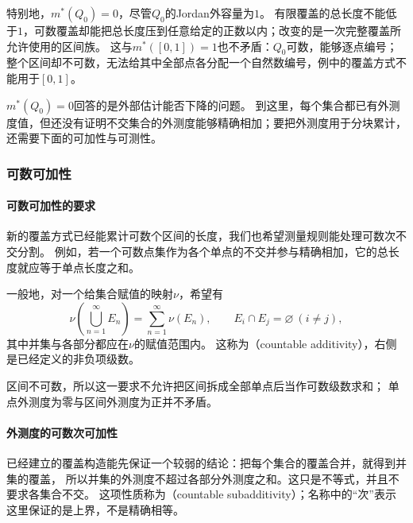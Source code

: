特别地，$m^*(Q_0)=0$，尽管$Q_0$的Jordan外容量为$1$。
有限覆盖的总长度不能低于$1$，可数覆盖却能把总长度压到任意给定的正数以内；改变的是一次完整覆盖所允许使用的区间族。
这与$m^*([0,1])=1$也不矛盾：$Q_0$可数，能够逐点编号；整个区间却不可数，无法给其中全部点各分配一个自然数编号，例中的覆盖方式不能用于$[0,1]$。

$m^*(Q_0)=0$回答的是外部估计能否下降的问题。
到这里，每个集合都已有外测度值，但还没有证明不交集合的外测度能够精确相加；要把外测度用于分块累计，还需要下面的可加性与可测性。

\subsubsection{可数可加性}

\paragraph{可数可加性的要求}

新的覆盖方式已经能累计可数个区间的长度，我们也希望测量规则能处理可数次不交分割。
例如，若一个可数点集作为各个单点的不交并参与精确相加，它的总长度就应等于单点长度之和。

一般地，对一个给集合赋值的映射$\nu$，希望有
\[
 \nu\left(\bigcup_{n=1}^{\infty}E_n\right)=\sum_{n=1}^{\infty}\nu(E_n),
 \qquad E_i\cap E_j=\varnothing\ (i\neq j),
\]
其中并集与各部分都应在$\nu$的赋值范围内。
这称为（countable additivity），右侧是已经定义的非负项级数。

区间不可数，所以这一要求不允许把区间拆成全部单点后当作可数级数求和；
单点外测度为零与区间外测度为正并不矛盾。

\paragraph{外测度的可数次可加性}

已经建立的覆盖构造能先保证一个较弱的结论：把每个集合的覆盖合并，就得到并集的覆盖，
所以并集的外测度不超过各部分外测度之和。这只是不等式，并且不要求各集合不交。
这项性质称为（countable subadditivity）；名称中的“次”表示这里保证的是上界，不是精确相等。

